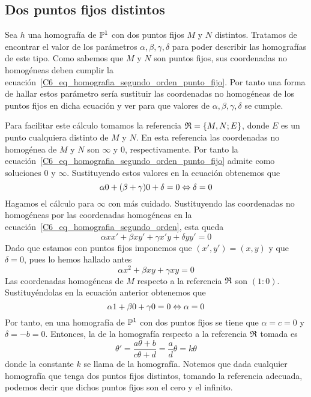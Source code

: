 \subsection{Dos puntos fijos distintos}
Sea $h$ una homografía de $\mathbb{P}^1$ con dos puntos fijos $M$ y $N$ distintos. Tratamos de encontrar el valor de los parámetros $\alpha, \beta,\gamma,\delta$ para poder describir las homografías de este tipo. Como sabemos que $M$ y $N$ son puntos fijos, sus coordenadas no homogéneas deben cumplir la ecuación~\eqref{C6_eq_homografia_segundo_orden_punto_fijo}. Por tanto una forma de hallar estos parámetro sería sustituir las coordenadas no homogéneas de los puntos fijos en dicha ecuación y ver para que valores de $\alpha, \beta,\gamma,\delta$ se cumple. 

Para facilitar este cálculo tomamos la referencia $\mathfrak{R}=\{M,N;E\}$, donde $E$ es un punto cualquiera distinto de $M$ y $N$. En esta referencia las coordenadas no homogénea de $M$ y $N$ son $\infty$ y $0$, respectivamente. Por tanto la ecuación~\eqref{C6_eq_homografia_segundo_orden_punto_fijo} admite como soluciones $0$ y $\infty$. Sustituyendo estos valores en la ecuación obtenemos que 
\begin{equation*}
	\alpha 0+(\beta+\gamma)0+\delta=0\Leftrightarrow\delta=0
\end{equation*}
Hagamos el cálculo para $\infty$ con más cuidado. Sustituyendo las coordenadas no homogéneas por las coordenadas homogéneas en la ecuación~\eqref{C6_eq_homografia_segundo_orden}, esta queda
\begin{equation}
	\alpha xx'+\beta xy'+\gamma x'y+\delta yy'=0
\end{equation}
Dado que estamos con puntos fijos imponemos que $(x',y')=(x,y)$ y que $\delta=0$, pues lo hemos hallado antes
\begin{equation*}
	\alpha x^2+\beta xy+\gamma xy=0
\end{equation*}
Las coordenadas homogéneas de $M$ respecto a la referencia $\mathfrak{R}$ son $(1:0)$. Sustituyéndolas en la ecuación anterior obtenemos que
\begin{equation*}
\alpha 1+\beta 0+\gamma 0=0\Leftrightarrow \alpha=0
\end{equation*}
Por tanto, en una homografía de $\mathbb{P}^1$ con dos puntos fijos se tiene que $\alpha=c=0$ y $\delta=-b=0$. Entonces, la  de la homografía respecto a la referencia $\mathfrak{R}$ tomada es
\begin{equation}
	\theta'=\frac{a\theta+b}{c\theta +d}=\frac{a}{d}\theta=k\theta
\end{equation}
donde la constante $k$ se llama  de la homografía. Notemos que dada cualquier homografía que tenga dos puntos fijos distintos, tomando la referencia adecuada, podemos decir que dichos puntos fijos son el cero y el infinito.


